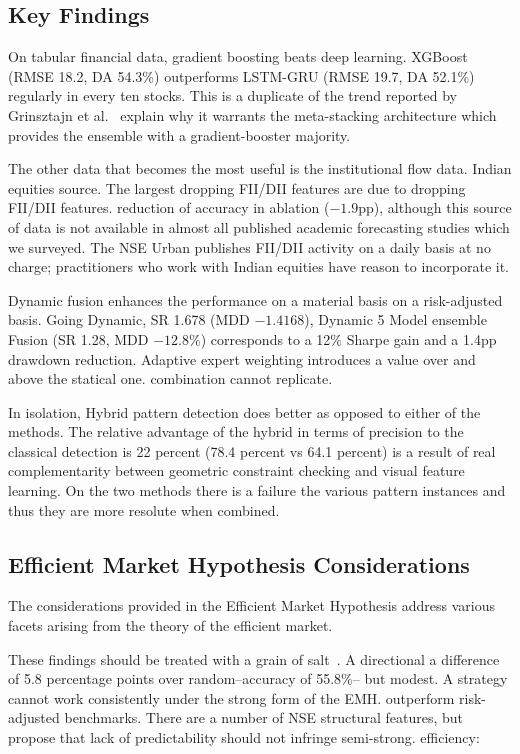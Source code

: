 \documentclass[10pt,a4paper,twoside]{article}
\begin{document}
\subsection{Key Findings}

On tabular financial data, gradient boosting beats deep learning.
XGBoost (RMSE 18.2, DA 54.3\%) outperforms LSTM-GRU (RMSE 19.7, DA 52.1\%)
regularly in every ten stocks. This is a duplicate of the trend reported by
Grinsztajn et al.~\cite{grinsztajn2022} explain why it warrants the meta-stacking
architecture which provides the ensemble with a gradient-booster majority.

The other data that becomes the most useful is the institutional flow data.
Indian equities source. The largest dropping FII/DII features are due to dropping FII/DII features.
reduction of accuracy in ablation ($-1.9$pp), although this source of data is not available
in almost all published academic forecasting studies which we surveyed. The NSE
Urban publishes FII/DII activity on a daily basis at no charge; practitioners who work with Indian
equities have reason to incorporate it.

Dynamic fusion enhances the performance on a material basis on a risk-adjusted basis.
Going Dynamic, SR 1.678 (MDD $-1.4168$), Dynamic 5 Model ensemble
Fusion (SR 1.28, MDD $-12.8\%$) corresponds to a 12\% Sharpe gain and a
1.4pp drawdown reduction. Adaptive expert weighting introduces a value over and above the statical one.
combination cannot replicate.

In isolation, Hybrid pattern detection does better as opposed to either of the methods.
The relative advantage of the hybrid in terms of precision to the classical detection is 22 percent
(78.4 percent vs 64.1 percent) is a result of real complementarity between geometric
constraint checking and visual feature learning. On the two methods there is a failure
the various pattern instances and thus they are more resolute when combined.

\subsection{Efficient Market Hypothesis Considerations}

The considerations provided in the Efficient Market Hypothesis address various facets arising from the theory of the efficient market.

These findings should be treated with a grain of salt~\cite{fama1970}. A directional
a difference of 5.8 percentage points over random--accuracy of 55.8\%--
but modest. A strategy cannot work consistently under the strong form of the EMH.
outperform risk-adjusted benchmarks. There are a number of NSE structural features,
but propose that lack of predictability should not infringe semi-strong.
efficiency:
\end{document}
